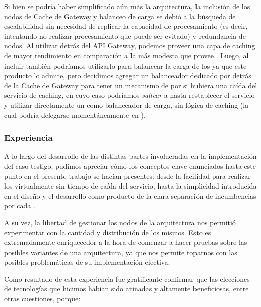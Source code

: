 Si bien se podría haber simplificado aún más la arquitectura, la inclusión de los nodos de Cache de Gateway y balanceo de carga se debió a la búsqueda de escalabilidad sin necesidad de replicar la capacidad de procesamiento (es decir, intentando no realizar procesamiento que puede ser evitado) y redundancia de nodos. Al utilizar  detrás del API Gateway, podemos proveer una capa de caching de mayor rendimiento en comparación a la más modesta que provee . Luego, al incluir  también podríamos utilizarlo para balancear la carga de los  ya que este producto lo admite, pero decidimos agregar un balanceador dedicado por detrás de la Cache de Gateway para tener un mecanismo de  por si hubiera una caída del servicio de caching, en cuyo caso podríamos \textit{saltear} a  hasta restablecer el servicio y utilizar directamente un  como balanceador de carga, sin lógica de caching (la cual podría delegarse momentáneamente en ).

\subsubsection{Experiencia}

A lo largo del desarrollo de las distintas partes involucradas en la implementación del caso testigo, pudimos apreciar cómo los conceptos clave enunciados hasta este punto en el presente trabajo se hacían presentes: desde la facilidad para realizar los  virtualmente sin tiempo de caída del servicio, hasta la simplicidad introducida en el diseño y el desarrollo como producto de la clara separación de incumbencias por cada .

A su vez, la libertad de gestionar los nodos de la arquitectura nos permitió experimentar con la cantidad y distribución de los mismos. Esto es extremadamente enriquecedor a la hora de comenzar a hacer pruebas sobre las posibles variantes de una arquitectura, ya que nos permite toparnos con las posibles problemáticas de su implementación efectiva.

Como resultado de esta experiencia fue gratificante confirmar que las elecciones de tecnologías que hicimos habían sido atinadas y altamente beneficiosas, entre otras cuestiones, porque:

